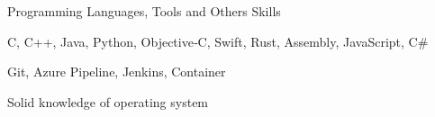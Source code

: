 

\begin{cventries}

  \cventry
    {Programming Languages, Tools and Others} %
    {Skills} %
    {} %
    {} %
    {
      \begin{cvitems} %
        \item {C, C++, Java, Python, Objective‐C, Swift, Rust, Assembly, JavaScript, C\#}
        \item {Git, Azure Pipeline, Jenkins, Container}
        \item {Solid knowledge of operating system}
      \end{cvitems}
    }

\end{cventries}
